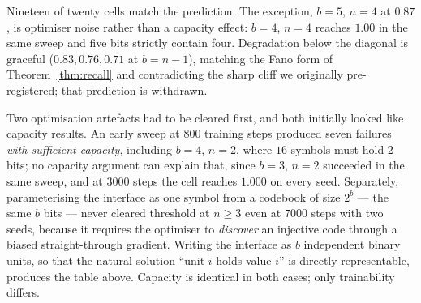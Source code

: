 Nineteen of twenty cells match the prediction. The exception, $b=5$, $n=4$ at
$0.87$, is optimiser noise rather than a capacity effect: $b=4$, $n=4$ reaches
$1.00$ in the same sweep and five bits strictly contain four. Degradation below
the diagonal is graceful ($0.83, 0.76, 0.71$ at $b=n-1$), matching the Fano form
of Theorem~\ref{thm:recall} and contradicting the sharp cliff we originally
pre-registered; that prediction is withdrawn.

Two optimisation artefacts had to be cleared first, and both initially looked
like capacity results. An early sweep at $800$ training steps produced seven
failures \emph{with sufficient capacity}, including $b=4$, $n=2$, where $16$
symbols must hold $2$ bits; no capacity argument can explain that, since $b=3$,
$n=2$ succeeded in the same sweep, and at $3000$ steps the cell reaches $1.000$
on every seed. Separately, parameterising the interface as one symbol from a
codebook of size $2^b$ --- the same $b$ bits --- never cleared threshold at
$n \ge 3$ even at $7000$ steps with two seeds, because it requires the optimiser
to \emph{discover} an injective code through a biased straight-through gradient.
Writing the interface as $b$ independent binary units, so that the natural
solution ``unit $i$ holds value $i$'' is directly representable, produces the
table above. Capacity is identical in both cases; only trainability differs.
